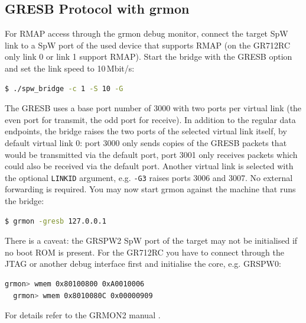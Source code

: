 \subsection{GRESB Protocol with grmon}
\label{sec:gresb}

For \gls{RMAP} access through the grmon debug monitor, connect the target
\gls{SpW} link to a \gls{SpW} port of the used device that supports \gls{RMAP}
(on the \gls{GR712RC} only link 0 or link 1 support \gls{RMAP}). Start the
bridge with the GRESB option and set the link speed to 10\,Mbit/s:

\begin{lstlisting}[language=bash]
  $ ./spw_bridge -c 1 -S 10 -G
\end{lstlisting}

\noindent
The GRESB uses a base port number of 3000 with two ports per virtual link
(the even port for transmit, the odd port for receive). In addition to the
regular data endpoints, the bridge raises the two ports of the selected virtual
link itself, by default virtual link 0: port 3000 only sends copies of the
GRESB packets that would be transmitted via the default port, port 3001 only
receives packets which could also be received via the default port. Another
virtual link is selected with the optional \texttt{LINKID} argument, e.g.
\texttt{-G3} raises ports 3006 and 3007. No external forwarding is
required. You may now start grmon against the machine that runs the bridge:

\begin{lstlisting}[language=bash]
  $ grmon -gresb 127.0.0.1
\end{lstlisting}

\noindent
There is a caveat: the GRSPW2 \gls{SpW} port of the target may not be
initialised if no boot ROM is present. For the \gls{GR712RC} you have to
connect through the JTAG or another debug interface first and initialise the
core, e.g. GRSPW0:

\begin{lstlisting}[language=bash]
  grmon> wmem 0x80100800 0xA0010006
  grmon> wmem 0x8010080C 0x00000909
\end{lstlisting}

\noindent
For details refer to the GRMON2 manual \cite{GRMON2UM}.

